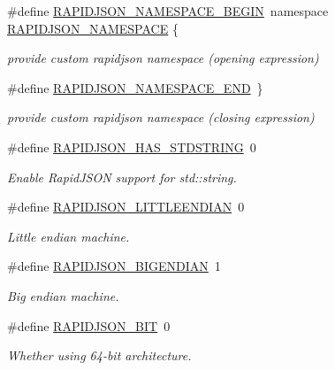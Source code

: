 \begin{DoxyCompactItemize}
\#define \hyperlink{a00636_gad3806c8251fdc7da9618b7e922674ffc}{R\+A\+P\+I\+D\+J\+S\+O\+N\+\_\+\+N\+A\+M\+E\+S\+P\+A\+C\+E\+\_\+\+B\+E\+G\+IN}~namespace \hyperlink{a00636_ga743a79d3af927391fe3eb5c979136899}{R\+A\+P\+I\+D\+J\+S\+O\+N\+\_\+\+N\+A\+M\+E\+S\+P\+A\+CE} \{
\begin{DoxyCompactList}\small\item\em provide custom rapidjson namespace (opening expression) \end{DoxyCompactList}\item 
\#define \hyperlink{a00636_gaf18f052a98b9f5df5448d39484b743c1}{R\+A\+P\+I\+D\+J\+S\+O\+N\+\_\+\+N\+A\+M\+E\+S\+P\+A\+C\+E\+\_\+\+E\+ND}~\}
\begin{DoxyCompactList}\small\item\em provide custom rapidjson namespace (closing expression) \end{DoxyCompactList}\item 
\#define \hyperlink{a00636_ga2f2eef0ee4477f3fe5874703a66e997f}{R\+A\+P\+I\+D\+J\+S\+O\+N\+\_\+\+H\+A\+S\+\_\+\+S\+T\+D\+S\+T\+R\+I\+NG}~0
\begin{DoxyCompactList}\small\item\em Enable Rapid\+J\+S\+ON support for {\ttfamily std\+::string}. \end{DoxyCompactList}\item 
\mbox{\label{a00560_addcc0c3607c5790f35cc4c15885ff97c}} 
\#define \hyperlink{a00560_addcc0c3607c5790f35cc4c15885ff97c}{R\+A\+P\+I\+D\+J\+S\+O\+N\+\_\+\+L\+I\+T\+T\+L\+E\+E\+N\+D\+I\+AN}~0
\begin{DoxyCompactList}\small\item\em Little endian machine. \end{DoxyCompactList}\item 
\mbox{\label{a00560_ac7951ebf8a2624ab85d2dcd3ec7af974}} 
\#define \hyperlink{a00560_ac7951ebf8a2624ab85d2dcd3ec7af974}{R\+A\+P\+I\+D\+J\+S\+O\+N\+\_\+\+B\+I\+G\+E\+N\+D\+I\+AN}~1
\begin{DoxyCompactList}\small\item\em Big endian machine. \end{DoxyCompactList}\item 
\mbox{\label{a00560_a93973847cb99354b6b5bb5605aa7fe52}} 
\#define \hyperlink{a00560_a93973847cb99354b6b5bb5605aa7fe52}{R\+A\+P\+I\+D\+J\+S\+O\+N\+\_\+B\+IT}~0
\begin{DoxyCompactList}\small\item\em Whether using 64-\/bit architecture. \end{DoxyCompactList}\item 

\end{DoxyCompactItemize}
